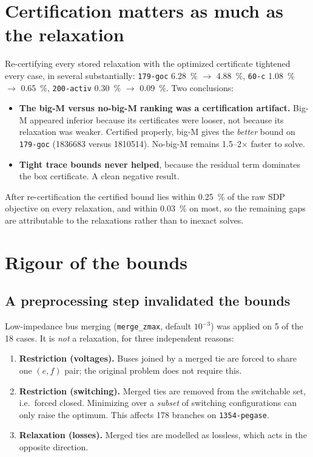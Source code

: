 \documentclass[11pt]{article}
\newcommand{\code}[1]{\texttt{\small #1}}
\begin{document}
\section{Certification matters as much as the relaxation}

Re-certifying every stored relaxation with the optimized certificate tightened every case, in several
substantially: \code{179-goc} \SI{6.28}{\percent} $\to$ \SI{4.88}{\percent}, \code{60-c}
\SI{1.08}{\percent} $\to$ \SI{0.65}{\percent}, \code{200-activ} \SI{0.30}{\percent} $\to$
\SI{0.09}{\percent}. Two conclusions:

\begin{itemize}
  \item \textbf{The big-M versus no-big-M ranking was a certification artifact.} Big-M appeared inferior
        because its certificates were looser, not because its relaxation was weaker. Certified properly,
        big-M gives the \emph{better} bound on \code{179-goc} (\num{1836683} versus \num{1810514}).
        No-big-M remains 1.5--2$\times$ faster to solve.
  \item \textbf{Tight trace bounds never helped}, because the residual term dominates the box
        certificate. A clean negative result.
\end{itemize}

After re-certification the certified bound lies within \SI{0.25}{\percent} of the raw SDP objective on
every relaxation, and within \SI{0.03}{\percent} on most, so the remaining gaps are attributable to the
relaxations rather than to inexact solves.

\section{Rigour of the bounds}\label{sec:rigour}

\subsection{A preprocessing step invalidated the bounds}

Low-impedance bus merging (\code{merge\_zmax}, default $10^{-3}$) was applied on 5 of the 18 cases. It is
\emph{not} a relaxation, for three independent reasons:

\begin{enumerate}
  \item \textbf{Restriction (voltages).} Buses joined by a merged tie are forced to share one $(e,f)$
        pair; the original problem does not require this.
  \item \textbf{Restriction (switching).} Merged ties are removed from the switchable set, i.e.\ forced
        closed. Minimizing over a \emph{subset} of switching configurations can only raise the optimum.
        This affects 178 branches on \code{1354-pegase}.
  \item \textbf{Relaxation (losses).} Merged ties are modelled as lossless, which acts in the opposite
        direction.
\end{enumerate}
\end{document}
